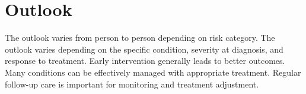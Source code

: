 \section{Outlook}
The outlook varies from person to person depending on risk category. The outlook varies depending on the specific condition, severity at diagnosis, and response to treatment. Early intervention generally leads to better outcomes. Many conditions can be effectively managed with appropriate treatment. Regular follow-up care is important for monitoring and treatment adjustment.
